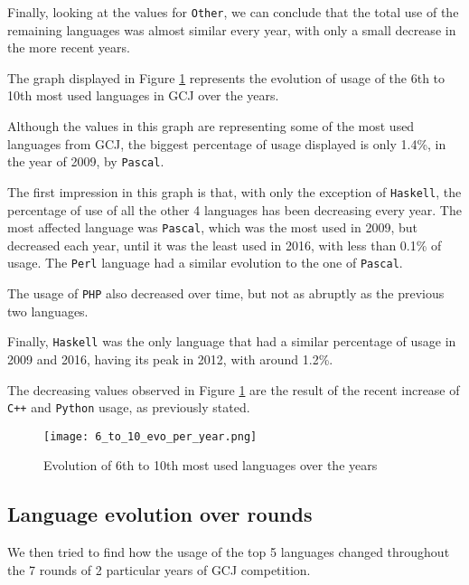 \documentclass{article}
\begin{document}
\begin{multicols*}{2}
Finally, looking at the values for \texttt{Other}, we can conclude that the total use of the remaining languages was almost similar every year, with only a small decrease in the more recent years.


The graph displayed in Figure \ref{fig:6_to_10_evo} represents the evolution of usage of the 6th to 10th most used languages in GCJ over the years.


Although the values in this graph are representing some of the most used languages from GCJ, the biggest percentage of usage displayed is only 1.4\%, in the year of 2009, by \texttt{Pascal}.




The first impression in this graph is that, with only the exception of \texttt{Haskell}, the percentage of use of all the other 4 languages has been decreasing every year. The most affected language was \texttt{Pascal}, which was the most used in 2009, but decreased each year, until it was the least used in 2016, with less than 0.1\% of usage. The \texttt{Perl} language had a similar evolution to the one of \texttt{Pascal}.

The usage of \texttt{PHP} also decreased over time, but not as abruptly as the previous two languages.

Finally, \texttt{Haskell} was the only language that had a similar percentage of usage in 2009 and 2016, having its peak in 2012, with around 1.2\%.

The decreasing values observed in Figure \ref{fig:6_to_10_evo} are the result of the recent increase of \texttt{C++} and \texttt{Python} usage, as previously stated.

\begin{figure}[H]
    \centering
    \texttt{[image: 6\_to\_10\_evo\_per\_year.png]}
    \caption{Evolution of 6th to 10th most used languages over the years}
    \label{fig:6_to_10_evo}
\end{figure}


\subsection{Language evolution over rounds}

We then tried to find how the usage of the top 5 languages changed throughout the 7 rounds of 2 particular years of GCJ competition.


\end{multicols*}
\end{document}
